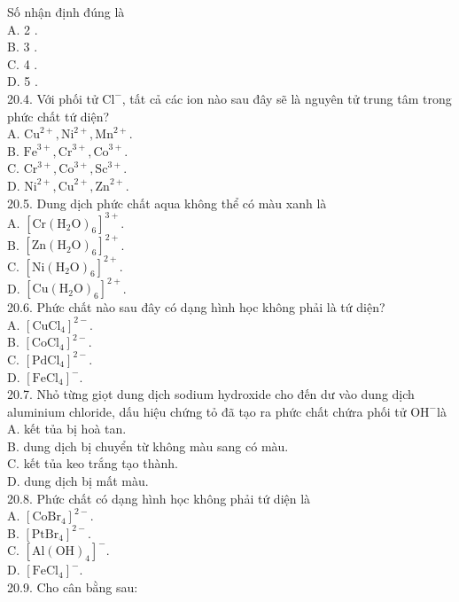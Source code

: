 \documentclass[10pt]{article}
\begin{document}
Số nhận định đúng là\\
A. 2 .\\
B. 3 .\\
C. 4 .\\
D. 5 .\\
20.4. Với phối tử $\mathrm{Cl}^{-}$, tất cả các ion nào sau đây sẽ là nguyên tử trung tâm trong phức chất tứ diện?\\
A. $\mathrm{Cu}^{2+}, \mathrm{Ni}^{2+}, \mathrm{Mn}^{2+}$.\\
B. $\mathrm{Fe}^{3+}, \mathrm{Cr}^{3+}, \mathrm{Co}^{3+}$.\\
C. $\mathrm{Cr}^{3+}, \mathrm{Co}^{3+}, \mathrm{Sc}^{3+}$.\\
D. $\mathrm{Ni}^{2+}, \mathrm{Cu}^{2+}, \mathrm{Zn}^{2+}$.\\
20.5. Dung dịch phức chất aqua không thể có màu xanh là\\
A. $\left[\mathrm{Cr}\left(\mathrm{H}_{2} \mathrm{O}\right)_{6}\right]^{3+}$.\\
B. $\left[\mathrm{Zn}\left(\mathrm{H}_{2} \mathrm{O}\right)_{6}\right]^{2+}$.\\
C. $\left[\mathrm{Ni}\left(\mathrm{H}_{2} \mathrm{O}\right)_{6}\right]^{2+}$.\\
D. $\left[\mathrm{Cu}\left(\mathrm{H}_{2} \mathrm{O}\right)_{6}\right]^{2+}$.\\
20.6. Phức chất nào sau đây có dạng hình học không phải là tứ diện?\\
A. $\left[\mathrm{CuCl}_{4}\right]^{2-}$.\\
B. $\left[\mathrm{CoCl}_{4}\right]^{2-}$.\\
C. $\left[\mathrm{PdCl}_{4}\right]^{2-}$.\\
D. $\left[\mathrm{FeCl}_{4}\right]^{-}$.\\
20.7. Nhỏ từng giọt dung dịch sodium hydroxide cho đến dư vào dung dịch aluminium chloride, dấu hiệu chứng tỏ đã tạo ra phức chất chứra phối tử $\mathrm{OH}^{-}$là\\
A. kết tủa bị hoà tan.\\
B. dung dịch bị chuyển từ không màu sang có màu.\\
C. kết tủa keo trắng tạo thành.\\
D. dung dịch bị mất màu.\\
20.8. Phức chất có dạng hình học không phải tứ diện là\\
A. $\left[\mathrm{CoBr}_{4}\right]^{2-}$.\\
B. $\left[\mathrm{PtBr}_{4}\right]^{2-}$.\\
C. $\left[\mathrm{Al}(\mathrm{OH})_{4}\right]^{-}$.\\
D. $\left[\mathrm{FeCl}_{4}\right]^{-}$.\\
20.9. Cho cân bằng sau:
\end{document}
